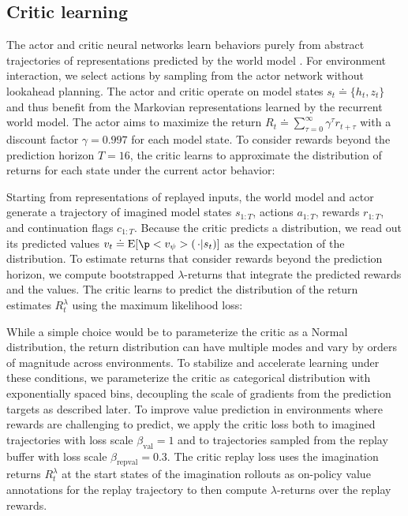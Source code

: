 \subsection*{Critic learning}

The actor and critic neural networks learn behaviors purely from abstract trajectories of representations predicted by the world model \citep{sutton1991dyna}.
For environment interaction, we select actions by sampling from the actor network without lookahead planning.
The actor and critic operate on model states $s_t \doteq \{h_t,z_t\}$ and thus benefit from the Markovian representations learned by the recurrent world model.
The actor aims to maximize the return $R_t \doteq \textstyle\sum_{\tau=0}^\infty \gamma^\tau r_{t+\tau}$ with a discount factor $\gamma=0.997$ for each model state.
To consider rewards beyond the prediction horizon $T=16$, the critic learns to approximate the distribution of returns \citep{bellemare2017c51} for each state under the current actor behavior:


Starting from representations of replayed inputs, the world model and actor generate a trajectory of
imagined model states $s_{1:T}$, actions $a_{1:T}$, rewards $r_{1:T}$, and continuation flags $c_{1:T}$.
Because the critic predicts a distribution, we read out its predicted values $v_t \doteq \operatorname{E}[\p<v_\psi>(\,\cdot|s_t)]$ as the expectation of the distribution.
To estimate returns that consider rewards beyond the prediction horizon, we compute bootstrapped $\lambda$-returns \citep{sutton2018rlbook} that integrate the predicted rewards and the values.
The critic learns to predict the distribution of the return estimates $R^\lambda_t$ using the maximum likelihood loss:


While a simple choice would be to parameterize the critic as a Normal distribution, the return distribution can have multiple modes and vary by orders of magnitude across environments. To stabilize and accelerate learning under these conditions, we parameterize the critic as categorical distribution with exponentially spaced bins, decoupling the scale of gradients from the prediction targets as described later.
To improve value prediction in environments where rewards are challenging to predict, we apply the critic loss both to imagined trajectories with loss scale $\beta_{\mathrm{val}}=1$ and to trajectories sampled from the replay buffer with loss scale $\beta_{\mathrm{repval}}=0.3$. The critic replay loss uses the imagination returns $R^\lambda_t$ at the start states of the imagination rollouts as on-policy value annotations for the replay trajectory to then compute $\lambda$-returns over the replay rewards.

